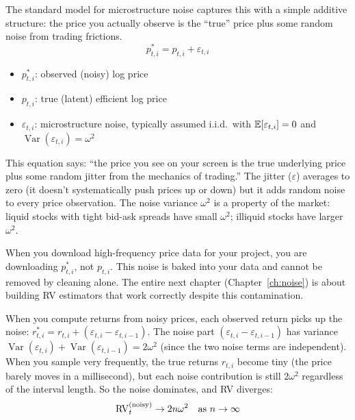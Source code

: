 The standard model for microstructure noise \citep{ABDL2001, BNS2002} captures this with a simple additive structure:
the price you actually observe is the ``true'' price plus some random noise from trading frictions.
\begin{equation}
  p^*_{t,i} = p_{t,i} + \varepsilon_{t,i}
  \label{eq:noise-model}
\end{equation}
\begin{itemize}[nosep]
  \item $p^*_{t,i}$: observed (noisy) log price
  \item $p_{t,i}$: true (latent) efficient log price
  \item $\varepsilon_{t,i}$: microstructure noise, typically assumed i.i.d.\ with $\mathbb{E}[\varepsilon_{t,i}] = 0$ and $\operatorname{Var}(\varepsilon_{t,i}) = \omega^2$
\end{itemize}

\begin{intuition}
This equation says: ``the price you see on your screen is the true underlying price plus some random jitter from the mechanics of trading.''
The jitter ($\varepsilon$) averages to zero (it doesn't systematically push prices up or down) but it adds random noise to every price observation.
The noise variance $\omega^2$ is a property of the market: liquid stocks with tight bid-ask spreads have small $\omega^2$; illiquid stocks have larger $\omega^2$.
\end{intuition}

\begin{projectconnection}
When you download high-frequency price data for your project, you are downloading $p^*_{t,i}$, not $p_{t,i}$.
This noise is baked into your data and cannot be removed by cleaning alone.
The entire next chapter (Chapter~\ref{ch:noise}) is about building RV estimators that work correctly despite this contamination.
\end{projectconnection}

When you compute returns from noisy prices, each observed return picks up the noise:
$r^*_{t,i} = r_{t,i} + (\varepsilon_{t,i} - \varepsilon_{t,i-1})$.
The noise part $(\varepsilon_{t,i} - \varepsilon_{t,i-1})$ has variance $\operatorname{Var}(\varepsilon_{t,i}) + \operatorname{Var}(\varepsilon_{t,i-1}) = 2\omega^2$ (since the two noise terms are independent).
When you sample very frequently, the true returns $r_{t,i}$ become tiny (the price barely moves in a millisecond), but each noise contribution is still $2\omega^2$ regardless of the interval length.
So the noise dominates, and RV diverges:
\begin{equation}
  \operatorname{RV}_t^{(\text{noisy})} \to 2n\omega^2 \quad \text{as } n \to \infty
  \label{eq:rv-noise-divergence}
\end{equation}

